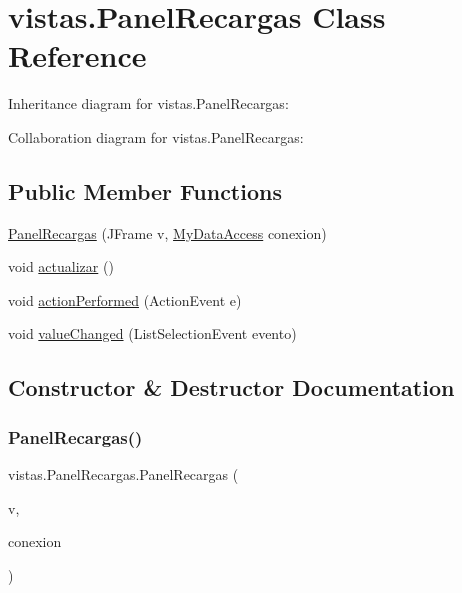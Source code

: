 \hypertarget{classvistas_1_1_panel_recargas}{}\section{vistas.\+Panel\+Recargas Class Reference}
\label{classvistas_1_1_panel_recargas}


Inheritance diagram for vistas.\+Panel\+Recargas\+:


Collaboration diagram for vistas.\+Panel\+Recargas\+:
\subsection*{Public Member Functions}
\begin{DoxyCompactItemize}
\item 
\mbox{\hyperlink{classvistas_1_1_panel_recargas_ae16f46f7e14cd81255a8433cdc439aef}{Panel\+Recargas}} (J\+Frame v, \mbox{\hyperlink{classconexion_s_q_l_1_1_my_data_access}{My\+Data\+Access}} conexion)
\item 
void \mbox{\hyperlink{classvistas_1_1_panel_recargas_a8132b8aab3f57014054fd1bee3cad853}{actualizar}} ()
\item 
void \mbox{\hyperlink{classvistas_1_1_panel_recargas_ad3607075fb4de36ea502e651729b390c}{action\+Performed}} (Action\+Event e)
\item 
void \mbox{\hyperlink{classvistas_1_1_panel_recargas_af1bcd93b4a920d7cafaf6488af2cb6f4}{value\+Changed}} (List\+Selection\+Event evento)
\end{DoxyCompactItemize}


\subsection{Constructor \& Destructor Documentation}
\mbox{\label{classvistas_1_1_panel_recargas_ae16f46f7e14cd81255a8433cdc439aef}} 
\subsubsection{\texorpdfstring{Panel\+Recargas()}{PanelRecargas()}}
{\footnotesize\ttfamily vistas.\+Panel\+Recargas.\+Panel\+Recargas (\begin{DoxyParamCaption}\item[{J\+Frame}]{v,  }\item[{\mbox{\hyperlink{classconexion_s_q_l_1_1_my_data_access}{My\+Data\+Access}}}]{conexion }\end{DoxyParamCaption})\hspace{0.3cm}{\ttfamily [inline]}}

